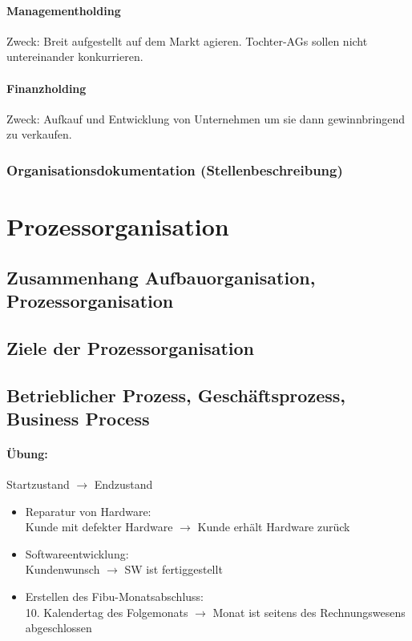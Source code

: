 \paragraph{Managementholding} Zweck: Breit aufgestellt auf dem Markt agieren. Tochter-AGs sollen nicht untereinander konkurrieren.
\paragraph{Finanzholding}
Zweck: Aufkauf und Entwicklung von Unternehmen um sie dann gewinnbringend zu verkaufen.
\subsubsection{Organisationsdokumentation (Stellenbeschreibung)}

\section{Prozessorganisation}
\subsection{Zusammenhang Aufbauorganisation, Prozessorganisation}
\subsection{Ziele der Prozessorganisation}
\subsection{Betrieblicher Prozess, Geschäftsprozess, Business Process}
\paragraph{Übung:}
Startzustand $\to$ Endzustand
\begin{itemize}
\item Reparatur von Hardware:\\
Kunde mit defekter Hardware $\to$ Kunde erhält Hardware zurück
\item Softwareentwicklung:\\
Kundenwunsch $\to$ SW ist fertiggestellt
\item Erstellen des Fibu-Monatsabschluss:\\
10. Kalendertag des Folgemonats $\to$ Monat ist seitens des Rechnungswesens abgeschlossen
\end{itemize}

